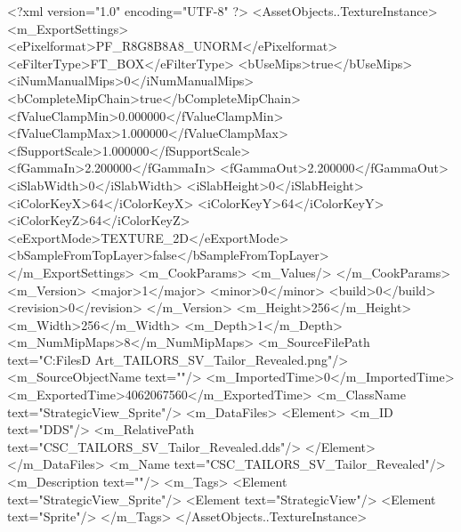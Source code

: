 <?xml version="1.0" encoding="UTF-8" ?>
<AssetObjects..TextureInstance>
	<m_ExportSettings>
		<ePixelformat>PF_R8G8B8A8_UNORM</ePixelformat>
		<eFilterType>FT_BOX</eFilterType>
		<bUseMips>true</bUseMips>
		<iNumManualMips>0</iNumManualMips>
		<bCompleteMipChain>true</bCompleteMipChain>
		<fValueClampMin>0.000000</fValueClampMin>
		<fValueClampMax>1.000000</fValueClampMax>
		<fSupportScale>1.000000</fSupportScale>
		<fGammaIn>2.200000</fGammaIn>
		<fGammaOut>2.200000</fGammaOut>
		<iSlabWidth>0</iSlabWidth>
		<iSlabHeight>0</iSlabHeight>
		<iColorKeyX>64</iColorKeyX>
		<iColorKeyY>64</iColorKeyY>
		<iColorKeyZ>64</iColorKeyZ>
		<eExportMode>TEXTURE_2D</eExportMode>
		<bSampleFromTopLayer>false</bSampleFromTopLayer>
	</m_ExportSettings>
	<m_CookParams>
		<m_Values/>
	</m_CookParams>
	<m_Version>
		<major>1</major>
		<minor>0</minor>
		<build>0</build>
		<revision>0</revision>
	</m_Version>
	<m_Height>256</m_Height>
	<m_Width>256</m_Width>
	<m_Depth>1</m_Depth>
	<m_NumMipMaps>8</m_NumMipMaps>
	<m_SourceFilePath text="C:\Users\Shadow\Desktop\Working Files\2D Art\Quarters\Tailors\StrategicView\CSC_TAILORS_SV_Tailor_Revealed.png"/>
	<m_SourceObjectName text=""/>
	<m_ImportedTime>0</m_ImportedTime>
	<m_ExportedTime>4062067560</m_ExportedTime>
	<m_ClassName text="StrategicView_Sprite"/>
	<m_DataFiles>
		<Element>
			<m_ID text="DDS"/>
			<m_RelativePath text="CSC_TAILORS_SV_Tailor_Revealed.dds"/>
		</Element>
	</m_DataFiles>
	<m_Name text="CSC_TAILORS_SV_Tailor_Revealed"/>
	<m_Description text=""/>
	<m_Tags>
		<Element text="StrategicView_Sprite"/>
		<Element text="StrategicView"/>
		<Element text="Sprite"/>
	</m_Tags>
</AssetObjects..TextureInstance>

